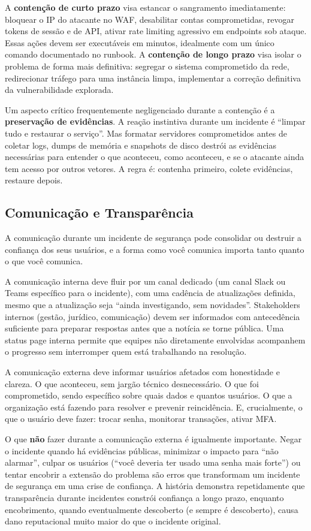 A \textbf{contenção de curto prazo} visa estancar o sangramento imediatamente:
bloquear o IP do atacante no WAF, desabilitar contas comprometidas, revogar
tokens de sessão e de API, ativar rate limiting agressivo em endpoints sob
ataque. Essas ações devem ser executáveis em minutos, idealmente com um único
comando documentado no runbook. A \textbf{contenção de longo prazo} visa isolar
o problema de forma mais definitiva: segregar o sistema comprometido da rede,
redirecionar tráfego para uma instância limpa, implementar a correção definitiva
da vulnerabilidade explorada.

Um aspecto crítico frequentemente negligenciado durante a contenção é a
\textbf{preservação de evidências}. A reação instintiva durante um incidente é
``limpar tudo e restaurar o serviço''. Mas formatar servidores comprometidos
antes de coletar logs, dumps de memória e snapshots de disco destrói as
evidências necessárias para entender o que aconteceu, como aconteceu, e se o
atacante ainda tem acesso por outros vetores. A regra é: contenha primeiro,
colete evidências, restaure depois.

\subsection{Comunicação e Transparência}

A comunicação durante um incidente de segurança pode consolidar ou destruir a
confiança dos seus usuários, e a forma como você comunica importa tanto quanto o
que você comunica.

A comunicação interna deve fluir por um canal dedicado (um canal Slack ou Teams
específico para o incidente), com uma cadência de atualizações definida, mesmo
que a atualização seja ``ainda investigando, sem novidades''. Stakeholders
internos (gestão, jurídico, comunicação) devem ser informados com antecedência
suficiente para preparar respostas antes que a notícia se torne pública. Uma
status page interna permite que equipes não diretamente envolvidas acompanhem o
progresso sem interromper quem está trabalhando na resolução.

A comunicação externa deve informar usuários afetados com honestidade e clareza.
O que aconteceu, sem jargão técnico desnecessário. O que foi comprometido,
sendo específico sobre quais dados e quantos usuários. O que a organização está
fazendo para resolver e prevenir reincidência. E, crucialmente, o que o usuário
deve fazer: trocar senha, monitorar transações, ativar MFA.

O que \textbf{não} fazer durante a comunicação externa é igualmente importante.
Negar o incidente quando há evidências públicas, minimizar o impacto para ``não
alarmar'', culpar os usuários (``você deveria ter usado uma senha mais forte'')
ou tentar encobrir a extensão do problema são erros que transformam um incidente
de segurança em uma crise de confiança. A história demonstra repetidamente que
transparência durante incidentes constrói confiança a longo prazo, enquanto
encobrimento, quando eventualmente descoberto (e sempre é descoberto), causa
dano reputacional muito maior do que o incidente original.


